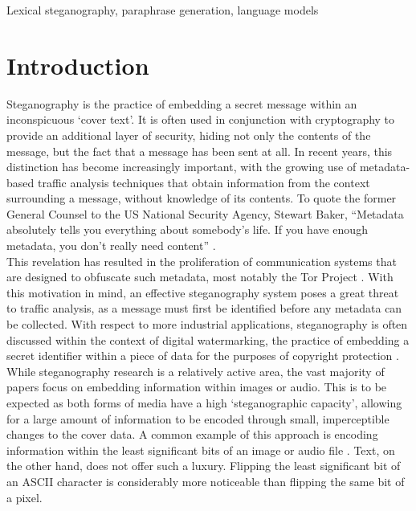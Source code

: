 \documentclass[12pt,a4paper]{article}
\begin{document}
\begin{keywords}
Lexical steganography, paraphrase generation, language models
\end{keywords}

\vspace{6mm}

\section{Introduction}
    \noindent Steganography is the practice of embedding a secret message within an inconspicuous `cover text'. It is often used in conjunction with cryptography to provide an additional layer of security, hiding not only the contents of the message, but the fact that a message has been sent at all. In recent years, this distinction has become increasingly important, with the growing use of metadata-based traffic analysis techniques that obtain information from the context surrounding a message, without knowledge of its contents.  To quote the former General Counsel to the US National Security Agency, Stewart Baker, ``Metadata absolutely tells you everything about somebody's life. If you have enough metadata, you don't really need content'' \cite{metadata}.\\
    \indent This revelation has resulted in the proliferation of communication systems that are designed to obfuscate such metadata, most notably the Tor Project \cite{tor}. With this motivation in mind, an effective steganography system poses a great threat to traffic analysis, as a message must first be identified before any metadata can be collected. With respect to more industrial applications, steganography is often discussed within the context of digital watermarking, the practice of embedding a secret identifier within a piece of data for the purposes of copyright protection \cite{cox}.\\
    \indent While steganography research is a relatively active area, the vast majority of papers focus on embedding information within images or audio. This is to be expected as both forms of media have a high `steganographic capacity', allowing for a large amount of information to be encoded through small, imperceptible changes to the cover data. A common example of this approach is encoding information within the least significant bits of an image or audio file \cite{image,audio}. Text, on the other hand, does not offer such a luxury. Flipping the least significant bit of an ASCII character is considerably more noticeable than flipping the same bit of a pixel.\\
\end{document}
